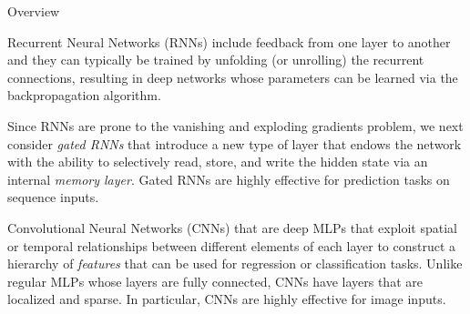 
\date{Chapter 26: Deep Learning}

\begin{frame}
\titlepage
\end{frame}

%
\begin{frame}{Overview}

Recurrent Neural Networks (RNNs) include feedback from one layer to another and
they can typically be trained by unfolding (or unrolling) the recurrent
connections, resulting in deep networks whose parameters can be learned
via the backpropagation algorithm. 

\medskip

Since RNNs are prone to the vanishing and exploding gradients
problem, we next consider {\em gated RNNs} that introduce a new type of
layer that endows the network with the ability to selectively read,
store, and write the hidden state via an internal {\em memory layer}.
Gated RNNs are highly effective for prediction tasks on sequence inputs.

\medskip

Convolutional Neural Networks (CNNs) that are
deep MLPs that exploit spatial or temporal relationships between
different elements of each layer to construct a hierarchy of {\em
features} that can be used for regression or classification tasks.
Unlike regular MLPs whose layers are fully connected, CNNs have layers
that are localized and sparse. In particular, CNNs are highly effective
for image inputs.
\end{frame}
%
%
%
